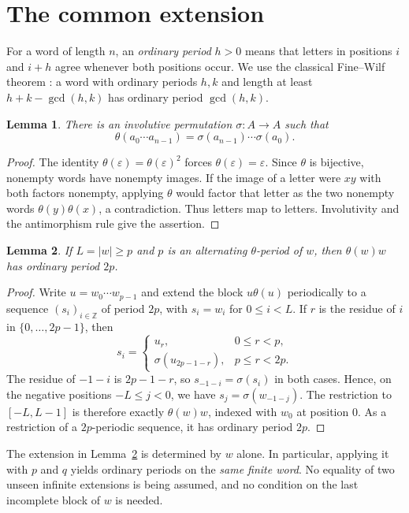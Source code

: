 \documentclass[10pt]{article}
\newtheorem{lemma}{Lemma}
\newcommand{\Z}{\mathbb Z}
\begin{document}
\section{The common extension}
For a word of length $n$, an \emph{ordinary period} $h>0$ means that
letters in positions $i$ and $i+h$ agree whenever both positions occur.
We use the classical Fine--Wilf theorem \cite{FW}: a word with ordinary
periods $h,k$ and length at least $h+k-\gcd(h,k)$ has ordinary period
$\gcd(h,k)$.

\begin{lemma}\label{lem:letters}
There is an involutive permutation $\sigma:A\to A$ such that
\[
\theta(a_0\cdots a_{n-1})=\sigma(a_{n-1})\cdots\sigma(a_0).
\]
\end{lemma}
\begin{proof}
The identity $\theta(\varepsilon)=\theta(\varepsilon)^2$ forces
$\theta(\varepsilon)=\varepsilon$. Since $\theta$ is bijective,
nonempty words have nonempty images. If the image of a letter were
$xy$ with both factors nonempty, applying $\theta$ would factor that
letter as the two nonempty words $\theta(y)\theta(x)$, a contradiction.
Thus letters map to letters. Involutivity and the antimorphism rule
give the assertion.
\end{proof}

\begin{lemma}\label{lem:extension}
If $L=|w|\ge p$ and $p$ is an alternating $\theta$-period of $w$,
then $\theta(w)w$ has ordinary period $2p$.
\end{lemma}
\begin{proof}
Write $u=w_0\cdots w_{p-1}$ and extend the block $u\theta(u)$
periodically to a sequence $(s_i)_{i\in\Z}$ of period $2p$, with
$s_i=w_i$ for $0\le i<L$. If $r$ is the residue of $i$ in
$\{0,\ldots,2p-1\}$, then
\[
 s_i=\begin{cases}u_r,&0\le r<p,\\
       \sigma(u_{2p-1-r}),&p\le r<2p.
       \end{cases}
\]
The residue of $-1-i$ is $2p-1-r$, so
$s_{-1-i}=\sigma(s_i)$ in both cases. Hence, on the negative positions
$-L\le j<0$, we have $s_j=\sigma(w_{-1-j})$.
The restriction to $[-L,L-1]$ is therefore exactly $\theta(w)w$,
indexed with $w_0$ at position $0$. As a restriction of a $2p$-periodic
sequence, it has ordinary period $2p$.
\end{proof}

The extension in Lemma~\ref{lem:extension} is determined by $w$ alone.
In particular, applying it with $p$ and $q$ yields ordinary periods
on the \emph{same finite word}. No equality of two unseen infinite
extensions is being assumed, and no condition on the last incomplete
block of $w$ is needed.
\end{document}
